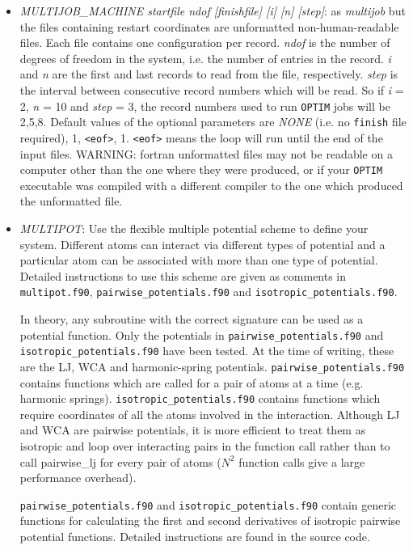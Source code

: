 \documentclass[12pt,a4paper,dvips]{article}
\begin{document}
\begin{itemize}
\item {\it MULTIJOB\_MACHINE startfile ndof [finishfile] [i] [n] [step]\/}: as {\it multijob} but the files containing restart 
coordinates are unformatted non-human-readable files. Each file contains one configuration per record. {\it ndof} is the
number of degrees of freedom in the system, i.e. the number of entries in the record. {\it i} and {\it n} are the first and last
records to read from the file, respectively. {\it step} is the interval between consecutive record numbers which will be read.
So if {\it i} = 2, {\it n} = 10 and {\it step} = 3, the record numbers used to run {\tt OPTIM} jobs will be 2,5,8.
Default values of the optional parameters are {\it NONE} (i.e. no {\tt finish} file required), 1, {\tt <eof>}, 1. {\tt <eof>} means
the loop will run until the end of the input files.
WARNING: fortran unformatted files may not be readable on a computer other than the one where they were produced, or if your {\tt OPTIM}
executable was compiled with a different compiler to the one which produced the unformatted file.

\item {\it MULTIPOT\/}: Use the flexible multiple potential scheme to define your system.
Different atoms can interact via different types of potential and a particular atom can be associated 
with more than one type of potential. Detailed instructions to use this scheme are given
as comments in {\tt multipot.f90}, { \tt pairwise\_potentials.f90} and {\tt isotropic\_potentials.f90}.

In theory, any subroutine with the correct signature can be used as a potential function. Only
the potentials in {\tt pairwise\_potentials.f90} and {\tt isotropic\_potentials.f90} have been tested.
At the time of writing, these are the LJ, WCA and harmonic-spring potentials. {\tt pairwise\_potentials.f90}
contains functions which are called for a pair of atoms at a time (e.g. harmonic springs). {\tt isotropic\_potentials.f90}
contains functions which require coordinates of all the atoms involved in the interaction. Although LJ and WCA are
pairwise potentials, it is more efficient to treat them as isotropic and loop over interacting pairs in the function
call rather than to call pairwise\_lj for every pair of atoms ($N^2$ function calls give a large performance overhead).

{\tt pairwise\_potentials.f90} and {\tt isotropic\_potentials.f90} contain generic functions for calculating the
first and second derivatives of isotropic pairwise potential functions. Detailed instructions are found in the source code.


\end{itemize}
\end{document}
